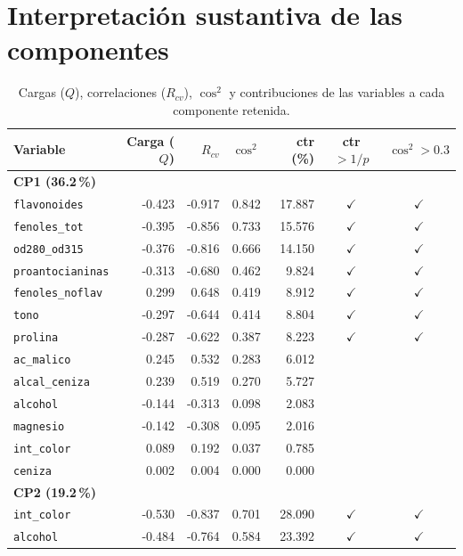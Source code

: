 \documentclass[11pt,a4paper]{article}
\begin{document}
\section{Interpretación sustantiva de las componentes}

\begin{table}[H]
\centering\small
\caption{Cargas ($Q$), correlaciones ($R_{cv}$), $\cos^2$ y contribuciones de las variables a cada componente retenida.}
\label{tab:load}
\begin{tabular}{lrrrrcc}
\toprule
Variable & Carga ($Q$) & $R_{cv}$ & $\cos^2$ & ctr (\%) & ctr $> 1/p$ & $\cos^2 > 0.3$ \\
\midrule
\multicolumn{7}{l}{\textbf{CP1 (36.2\,\%)}} \\
\texttt{flavonoides} & -0.423 & -0.917 & 0.842 & 17.887 & $\checkmark$ & $\checkmark$ \\
\texttt{fenoles\_tot} & -0.395 & -0.856 & 0.733 & 15.576 & $\checkmark$ & $\checkmark$ \\
\texttt{od280\_od315} & -0.376 & -0.816 & 0.666 & 14.150 & $\checkmark$ & $\checkmark$ \\
\texttt{proantocianinas} & -0.313 & -0.680 & 0.462 & 9.824 & $\checkmark$ & $\checkmark$ \\
\texttt{fenoles\_noflav} & 0.299 & 0.648 & 0.419 & 8.912 & $\checkmark$ & $\checkmark$ \\
\texttt{tono} & -0.297 & -0.644 & 0.414 & 8.804 & $\checkmark$ & $\checkmark$ \\
\texttt{prolina} & -0.287 & -0.622 & 0.387 & 8.223 & $\checkmark$ & $\checkmark$ \\
\texttt{ac\_malico} & 0.245 & 0.532 & 0.283 & 6.012 &  &  \\
\texttt{alcal\_ceniza} & 0.239 & 0.519 & 0.270 & 5.727 &  &  \\
\texttt{alcohol} & -0.144 & -0.313 & 0.098 & 2.083 &  &  \\
\texttt{magnesio} & -0.142 & -0.308 & 0.095 & 2.016 &  &  \\
\texttt{int\_color} & 0.089 & 0.192 & 0.037 & 0.785 &  &  \\
\texttt{ceniza} & 0.002 & 0.004 & 0.000 & 0.000 &  &  \\
\midrule
\multicolumn{7}{l}{\textbf{CP2 (19.2\,\%)}} \\
\texttt{int\_color} & -0.530 & -0.837 & 0.701 & 28.090 & $\checkmark$ & $\checkmark$ \\
\texttt{alcohol} & -0.484 & -0.764 & 0.584 & 23.392 & $\checkmark$ & $\checkmark$ \\

\end{tabular}
\end{table}
\end{document}

